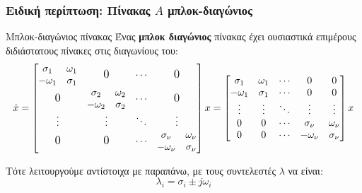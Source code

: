 \documentclass[11pt,a4paper,notitlepage,fleqn]{article}
\begin{document}
\subsubsection{Ειδική περίπτωση: Πίνακας \( A \) μπλοκ-διαγώνιος}
\begin{defn}{Μπλοκ-διαγώνιος πίνακας}{}
Ένας \textbf{μπλοκ διαγώνιος} πίνακας έχει ουσιαστικά
επιμέρους διδιάστατους πίνακες στις
διαγωνίους του:
\[
\dot x = \left[
\begin{matrix}
\begin{matrix}
\sigma_1 & \omega_1 \\ -\omega_1 & \sigma_1
\end{matrix} & \mathlarger{\mathlarger{0}} & \cdots & \mathlarger{\mathlarger{0}} \\
\mathlarger{\mathlarger{0}} & \begin{matrix}
\sigma_2 & \omega_2 \\ -\omega_2 & \sigma_2
\end{matrix} & \cdots & \mathlarger{\mathlarger{0}} \\
\vdots & \vdots & \ddots & \vdots\\
\mathlarger{\mathlarger{0}} & \mathlarger{\mathlarger{0}} & \cdots & \begin{matrix}
\sigma_\nu & \omega_\nu \\ -\omega_\nu & \sigma_\nu
\end{matrix}
\end{matrix}
\right]x
= \left[\begin{matrix}
\sigma_1 & \omega_1 & \cdots & 0 & 0\\
-\omega_1 & \sigma_1 & \cdots & 0 & 0\\
\vdots & \vdots & \ddots & \vdots & \vdots \\
0 & 0 & \cdots & \sigma_\nu & \omega_\nu \\
0 & 0 & \cdots & -\omega_\nu & \sigma_\nu
\end{matrix}\right]x
\]
\end{defn}

Τότε λειτουργούμε αντίστοιχα με παραπάνω, με τους συντελεστές \( \lambda \)
να είναι:
\[
\lambda_i = \sigma_i \pm j\omega_i
\]
\end{document}
